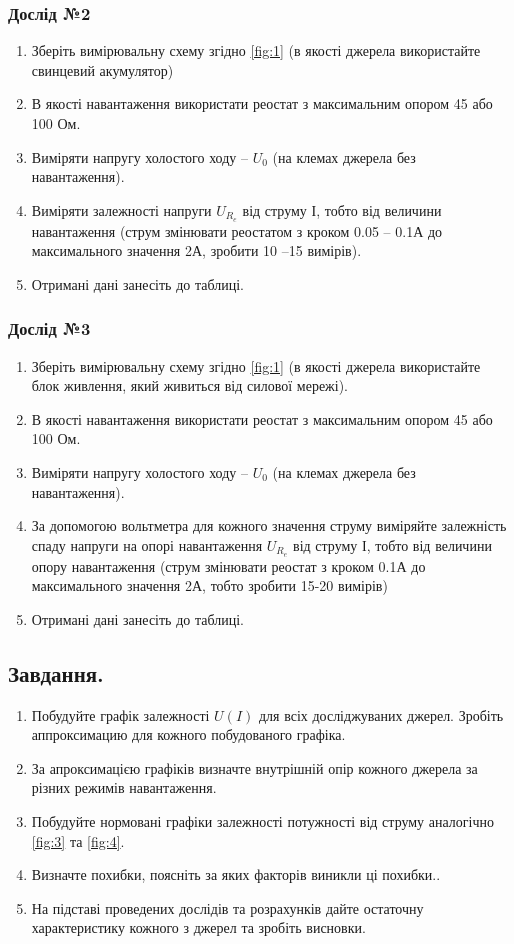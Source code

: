 \documentclass[a4paper,12pt]{article}
\begin{document}
\begin{justify}
	\subsubsection{Дослід №2}
	\begin{enumerate}
		\item Зберіть вимірювальну схему згідно \ref{fig:1} (в якості джерела використайте свинцевий акумулятор) 
		\item В якості навантаження використати реостат з максимальним опором 45 або 100 Ом.
		\item Виміряти напругу холостого ходу – $U_0$ (на клемах джерела без навантаження).
		\item Виміряти залежності напруги $U_{R_e}$ від струму $І$, тобто від величини навантаження (струм змінювати реостатом з кроком 0.05 – 0.1А до максимального значення 2А, зробити 10 –15 вимірів).
		\item Отримані дані занесіть до таблиці.
	\end{enumerate}
	\subsubsection{Дослід №3}
	\begin{enumerate}
		\item Зберіть вимірювальну схему згідно \ref{fig:1} (в якості джерела використайте блок живлення, який живиться від силової мережі).
		\item В якості навантаження використати реостат з максимальним опором 45 або 100 Ом.
		\item Виміряти напругу холостого ходу – $U_0$ (на клемах джерела без навантаження).
		\item За допомогою вольтметра для кожного значення струму виміряйте залежність спаду напруги на опорі навантаження $U_{R_e}$ від струму $І$, тобто від величини опору навантаження (струм змінювати реостат з кроком 0.1А до максимального значення 2А, тобто зробити 15-20 вимірів)
		\item Отримані дані занесіть до таблиці.
	\end{enumerate}
	\subsection{Завдання.}
	\begin{enumerate}
		\item Побудуйте графік залежності $U(I)$ для всіх досліджуваних джерел. Зробіть аппроксимацию для кожного побудованого графіка.
		\item За апроксимацією графіків визначте внутрішній опір кожного джерела за різних режимів навантаження.
		\item Побудуйте нормовані графіки залежності потужності від струму аналогічно \ref{fig:3} та \ref{fig:4}.
		\item Визначте похибки, поясніть за яких факторів виникли ці похибки..
		\item На підставі проведених дослідів та розрахунків дайте остаточну характеристику кожного з джерел та зробіть висновки.
	\end{enumerate}
	\newpage

\end{justify}
\end{document}
